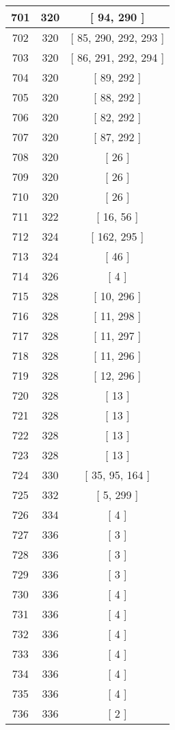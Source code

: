 \begin{center}
\begin{longtable}[H]{|| c c c ||}
\hline
701 & 320 & [ 94, 290 ] \\ 
\hline
702 & 320 & [ 85, 290, 292, 293 ] \\ 
\hline
703 & 320 & [ 86, 291, 292, 294 ] \\ 
\hline
704 & 320 & [ 89, 292 ] \\ 
\hline
705 & 320 & [ 88, 292 ] \\ 
\hline
706 & 320 & [ 82, 292 ] \\ 
\hline
707 & 320 & [ 87, 292 ] \\ 
\hline
708 & 320 & [ 26 ] \\ 
\hline
709 & 320 & [ 26 ] \\ 
\hline
710 & 320 & [ 26 ] \\ 
\hline
711 & 322 & [ 16, 56 ] \\ 
\hline
712 & 324 & [ 162, 295 ] \\ 
\hline
713 & 324 & [ 46 ] \\ 
\hline
714 & 326 & [ 4 ] \\ 
\hline
715 & 328 & [ 10, 296 ] \\ 
\hline
716 & 328 & [ 11, 298 ] \\ 
\hline
717 & 328 & [ 11, 297 ] \\ 
\hline
718 & 328 & [ 11, 296 ] \\ 
\hline
719 & 328 & [ 12, 296 ] \\ 
\hline
720 & 328 & [ 13 ] \\ 
\hline
721 & 328 & [ 13 ] \\ 
\hline
722 & 328 & [ 13 ] \\ 
\hline
723 & 328 & [ 13 ] \\ 
\hline
724 & 330 & [ 35, 95, 164 ] \\ 
\hline
725 & 332 & [ 5, 299 ] \\ 
\hline
726 & 334 & [ 4 ] \\ 
\hline
727 & 336 & [ 3 ] \\ 
\hline
728 & 336 & [ 3 ] \\ 
\hline
729 & 336 & [ 3 ] \\ 
\hline
730 & 336 & [ 4 ] \\ 
\hline
731 & 336 & [ 4 ] \\ 
\hline
732 & 336 & [ 4 ] \\ 
\hline
733 & 336 & [ 4 ] \\ 
\hline
734 & 336 & [ 4 ] \\ 
\hline
735 & 336 & [ 4 ] \\ 
\hline
736 & 336 & [ 2 ] \\ 

\end{longtable}
\end{center}
